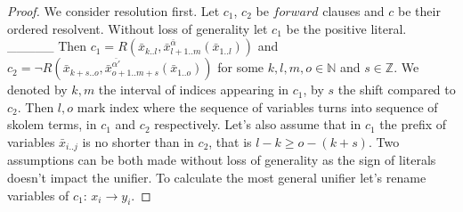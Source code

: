 \documentclass[english, shortabstract]{iithesis}
\theoremstyle{definition} \newtheorem{definition}{Definition}[chapter]
\theoremstyle{remark} \newtheorem{remark}[definition]{Observation}
\theoremstyle{plain} \newtheorem{theorem}[definition]{Theorem}
\theoremstyle{plain} \newtheorem{lemma}[definition]{Lemma}
\begin{document}
\begin{proof}
\par We consider resolution first. Let $c_1$, $c_2$ be $forward$ clauses and $c$ be their ordered resolvent.
Without loss of generality let $c_1$ be the positive literal. \_\_\_\_\_
Then $c_1=R(\bar{x}_{k..l}, \bar{x}^{\bar{\alpha}}_{{l+1..m}}(\bar{x}_{1..l}))$
and $c_2=\lnot R(\bar{x}_{k+s..o}, \bar{x}^{\bar{\alpha'}}_{{o+1..m+s}}(\bar{x}_{1..o}))$ for some $k,l,m,o\in \mathbb{N}$ and $s\in \mathbb{Z}$.
We denoted by $k, m$ the interval of indices appearing in $c_1$, by $s$ the shift compared to $c_2$.
Then $l, o$ mark index where the sequence of variables turns into sequence of skolem terms, in $c_1$ and $c_2$ respectively.
Let's also assume that in $c_1$ the prefix of variables $\bar{x}_{i..j}$
is no shorter than in $c_2$, that is $l-k\geq o-(k+s)$. Two assumptions can be both made without loss of generality as
the sign of literals doesn't impact the unifier.
To calculate the most general unifier let's rename variables of $c_1$: $x_i \rightarrow y_i $.


\end{proof}
\end{document}
